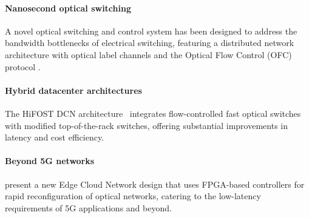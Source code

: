 \paragraph{Nanosecond optical switching}
A novel optical switching and control system has been designed to address the bandwidth bottlenecks of electrical switching, featuring a distributed network architecture with optical label channels and the Optical Flow Control (OFC) protocol \cite{Xue2022NanosecondNetworks}.

\paragraph{Hybrid datacenter architectures} The HiFOST DCN architecture~\cite{Yan2018HiFOST:Switches} integrates flow-controlled fast optical switches with modified top-of-the-rack switches, offering substantial improvements in latency and cost efficiency.

\paragraph{Beyond 5G networks} \citet{Santana2022TransparentApplications} present a new Edge Cloud Network design %
that uses %
FPGA-based controllers for rapid reconfiguration of optical networks, catering to the low-latency requirements of 5G applications and beyond.  %




